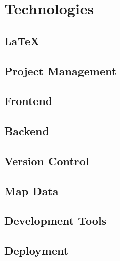 \section{Technologies}

\subsection{LaTeX}


\subsection{Project Management}



\subsection{Frontend}


\subsection{Backend}


\subsection{Version Control}


\subsection{Map Data}


\subsection{Development Tools}


\subsection{Deployment}

